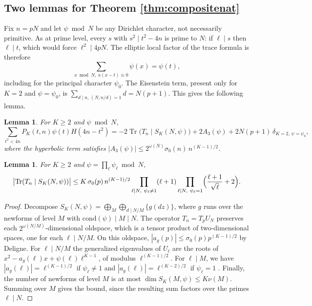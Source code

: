 \documentclass[11pt]{amsart}
\newtheorem{lemma}[theorem]{Lemma}
\theoremstyle{remark}
\newcommand{\Tr}{\operatorname{Tr}}
\begin{document}
\subsection{Two lemmas for Theorem \ref{thm:compositenat}}
Fix $n=pN$ and let $\psi\bmod N$ be any Dirichlet character, not necessarily primitive. As at prime level, every $s$ with $s^2\mid t^2-4n$ is prime to $N$: if $\ell\mid s$ then $\ell\mid t$, which would force $\ell^2\mid4pN$. The elliptic local factor of the trace formula \cite[Thm.~12.4.11]{CS} is therefore
\[
\sum_{x\bmod N,\ x(x-t)\equiv0}\psi(x)=\psi(t),
\]
including for the principal character $\psi_0$. The Eisenstein term, present only for $K=2$ and $\psi=\psi_0$, is $\sum_{d\mid n,\,(N,n/d)=1}d=N(p+1)$. This gives the following lemma.

\begin{lemma}\label{lem:trN}
For $K\ge2$ and $\psi\bmod N$,
\[
\sum_{t^2<4n}P_K(t,n)\psi(t)H(4n-t^2)=-2\Tr\bigl(T_n\mid S_K(N,\psi)\bigr)+2A_3(\psi)+2N(p+1)\,\delta_{K=2,\,\psi=\psi_0},
\]
where the hyperbolic term satisfies $|A_3(\psi)|\le2^{\omega(N)}\sigma_0(n)\,n^{(K-1)/2}$.
\end{lemma}

\begin{lemma}\label{lem:trbound}
For $K\ge2$ and $\psi=\prod_\ell\psi_\ell\bmod N$,
\[
\bigl|\Tr(T_n\mid S_K(N,\psi))\bigr|\le K\,\sigma_0(p)\,n^{(K-1)/2}\prod_{\ell\mid N,\ \psi_\ell\neq1}(\ell+1)\prod_{\ell\mid N,\ \psi_\ell=1}\Bigl(\frac{\ell+1}{\sqrt\ell}+2\Bigr).
\]
\end{lemma}
\begin{proof}
Decompose $S_K(N,\psi)=\bigoplus_{M}\bigoplus_{d\mid N/M}\{g(dz)\}$, where $g$ runs over the newforms of level $M$ with $\mathrm{cond}(\psi)\mid M\mid N$. The operator $T_n=T_pU_N$ preserves each $2^{\omega(N/M)}$-dimensional oldspace, which is a tensor product of two-dimensional spaces, one for each $\ell\mid N/M$. On this oldspace, $|a_g(p)|\le\sigma_0(p)p^{(K-1)/2}$ by Deligne. For $\ell\mid N/M$ the generalized eigenvalues of $U_\ell$ are the roots of $x^2-a_g(\ell)x+\psi(\ell)\ell^{K-1}$, of modulus $\ell^{(K-1)/2}$. For $\ell\mid M$, we have $|a_g(\ell)|=\ell^{(K-1)/2}$ if $\psi_\ell\ne1$ and $|a_g(\ell)|=\ell^{(K-2)/2}$ if $\psi_\ell=1$ \cite{AL}. Finally, the number of newforms of level $M$ is at most $\dim S_K(M,\psi)\le K\nu(M)$. Summing over $M$ gives the bound, since the resulting sum factors over the primes $\ell\mid N$.
\end{proof}
\end{document}
